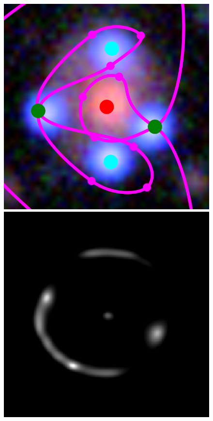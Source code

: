 \documentclass[usenatbib]{mn2e}
\newlength{\myplotswidth}
\begin{document}
\begin{figure}
  \centering

  \includegraphics[width=\myplotswidth]{fig/007025_input}
  \includegraphics[width=\myplotswidth]{fig/007025_arr_time_ipol} \\

\end{figure}
\end{document}
